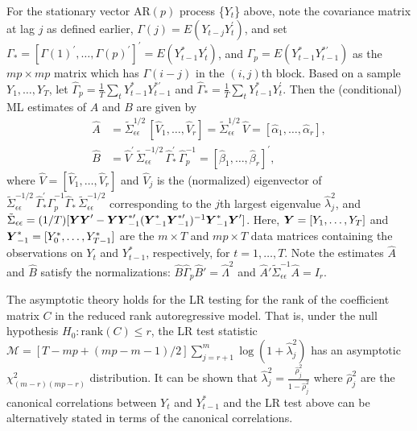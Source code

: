 For the stationary vector AR$(p)$ process \{$Y_t$\} above, note the covariance matrix at lag $j$ as defined earlier, $\Gamma (j) = E (Y_{t-j} Y_t^{\prime})$, and set $\Gamma_{*} = [\Gamma (1)^{\prime},\ldots,\Gamma (p)^{\prime}]^{\prime} = E(Y_{t-1}^{*} Y_t^{\prime})$, and $\Gamma_p = E(Y_{t-1}^{*} Y_{t-1}^{* \prime})$ as the $mp \times mp$ matrix which has $\Gamma (i-j)$ in the $(i,j)$th block. Based on a sample $Y_1 ,\ldots, Y_T$, let $\hat{\Gamma}_p=\frac{1}{T}\sum_t Y_{t-1}^{*} Y_{t-1}^{*\prime}$ and $\hat{\Gamma}_{*} = \frac{1}{T}\sum_t Y_{t-1}^{*} Y_t^{\prime}$. Then the (conditional) ML estimates of $A$ and $B$ are given by
	\begin{equation}\label{eqn:2AhatBhat}
	\begin{split}
	\hat{A}&= \tilde{\Sigma}_{\epsilon \epsilon}^{1/2} \, [\hat{V}_{1}, \ldots, \hat{V}_{r}] =  \tilde{\Sigma}_{\epsilon \epsilon}^{1/2}\, \hat{V} = [\hat{\alpha}_{1}, \ldots, \hat{\alpha}_{r}], \\
	\hat{B}&= \hat{V}^{\prime}\, \tilde{\Sigma}_{\epsilon \epsilon}^{-1/2}\, \hat{\Gamma}_{*}^{\prime}\,\hat{\Gamma}_p^{-1} = [\hat{\beta}_{1}, \ldots, \hat{\beta}_{r}]^{\prime},
	\end{split}
	\end{equation}
where $\hat{V} = [\hat{V}_1,\ldots,\hat{V}_r]$ and $\hat{V}_j$ is the (normalized) eigenvector of $\tilde{\Sigma}_{\epsilon \epsilon}^{-1/2}\, \hat{\Gamma}_{*}^{\prime} \hat{\Gamma}_p^{-1} \hat{\Gamma}_{*} \, \tilde{\Sigma}_{\epsilon \epsilon}^{-1/2}$ corresponding to the $j$th largest eigenvalue $\hat{\lambda}_j^2$, and $\tilde{\Sigma}_{\epsilon \epsilon} = (1/T) [\mbox{\boldmath{$Y$}} \mbox{\boldmath{$Y$}}^{\prime} - \mbox{\boldmath{$Y$}} \mbox{\boldmath{$Y$}}_{-1}^{* \prime} (\mbox{\boldmath{$Y$}}_{-1}^{*} \mbox{\boldmath{$Y$}}_{-1}^{* \prime})^{-1} \mbox{\boldmath{$Y$}}_{-1}^{*} \mbox{\boldmath{$Y$}}^{\prime} ]$.  Here, $\mbox{\boldmath{$Y$}} = [Y_1,\ldots,Y_T]$ and $\mbox{\boldmath{$Y$}}_{-1}^{*} = [Y_0^{*},\ldots,Y_{T-1}^{*}]$ are the $m \times T$ and $mp \times T$ data matrices containing the observations on $Y_t$ and $Y_{t-1}^{*}$, respectively, for $t = 1,\ldots, T$. Note the estimates $\hat{A}$ and $\hat{B}$ satisfy the normalizations: $\hat{B} \hat{\Gamma}_p \hat{B}'= \hat{\Lambda}^2$ and $\hat{A}' \tilde{\Sigma}_{\epsilon\epsilon}^{-1} \hat{A}= I_r$. 


The asymptotic theory holds for the LR testing for the rank of the coefficient matrix $C$ in the reduced rank autoregressive  model. That is, under the null hypothesis $H_0\!:\!\mbox{rank}(C) \leq r$, the LR test statistic ${\mathcal{M}} = [T\!-\!mp+(mp-m-1)/2] \sum_{j = r + 1}^{m} \log (1+\hat{\lambda}_{j}^{2})$ has an asymptotic $\chi_{(m-r)(mp-r)}^{2}$ distribution. It can be shown that $\hat{\lambda}_j^2=\frac{\hat{\rho}_j^2}{1-\hat{\rho}_j^2}$ where $\hat{\rho}_j^2$ are the canonical correlations between $Y_t$ and $Y_{t-1}^*$ and the LR test above can be alternatively stated in terms of the canonical correlations.


